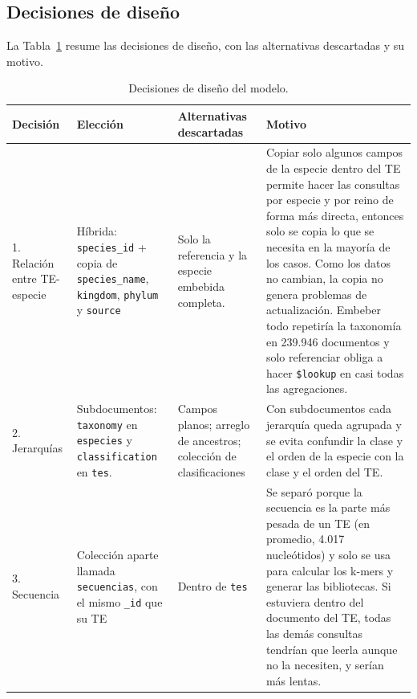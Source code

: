 \documentclass[unnumsec,namedate,webpdf,contemporary,large]{oup-authoring-template}
\begin{document}
\subsection{Decisiones de dise\~no}

La Tabla~\ref{tab:decisiones} resume las decisiones de dise\~no, con las alternativas descartadas y su motivo.

\begin{table}[!t]
\caption{Decisiones de dise\~no del modelo.\label{tab:decisiones}}
\footnotesize
\begin{tabular}{@{}p{}p{}p{}p{}@{}}
\toprule
Decisi\'on & Elecci\'on & Alternativas descartadas & Motivo \\
\midrule
1. Relaci\'on entre TE-especie & H\'ibrida: \texttt{species\_id} + copia de \texttt{species\_name}, \texttt{kingdom}, \texttt{phylum} y \texttt{source} & Solo la referencia y la especie embebida completa. & Copiar solo algunos campos de la especie dentro del TE permite hacer las consultas por especie y por reino de forma m\'as directa, entonces solo se copia lo que se necesita en la mayor\'ia de los casos. Como los datos no cambian, la copia no genera problemas de actualizaci\'on. Embeber todo repetir\'ia la taxonom\'ia en 239.946 documentos y solo referenciar obliga a hacer \texttt{\$lookup} en casi todas las agregaciones. \\
\noalign{\vspace{3pt}}
2. Jerarqu\'ias & Subdocumentos: \texttt{taxonomy} en \texttt{especies} y \texttt{classification} en \texttt{tes}. & Campos planos; arreglo de ancestros; colecci\'on de clasificaciones & Con subdocumentos cada jerarqu\'ia queda agrupada y se evita confundir la clase y el orden de la especie con la clase y el orden del TE. \\
\noalign{\vspace{3pt}}
3. Secuencia & Colecci\'on aparte llamada \texttt{secuencias}, con el mismo \texttt{\_id} que su TE & Dentro de \texttt{tes} & Se separ\'o porque la secuencia es la parte m\'as pesada de un TE (en promedio, 4.017 nucle\'otidos) y solo se usa para calcular los k-mers y generar las bibliotecas. Si estuviera dentro del documento del TE, todas las dem\'as consultas tendr\'ian que leerla aunque no la necesiten, y ser\'ian m\'as lentas. \\

\end{tabular}
\end{table}
\end{document}
